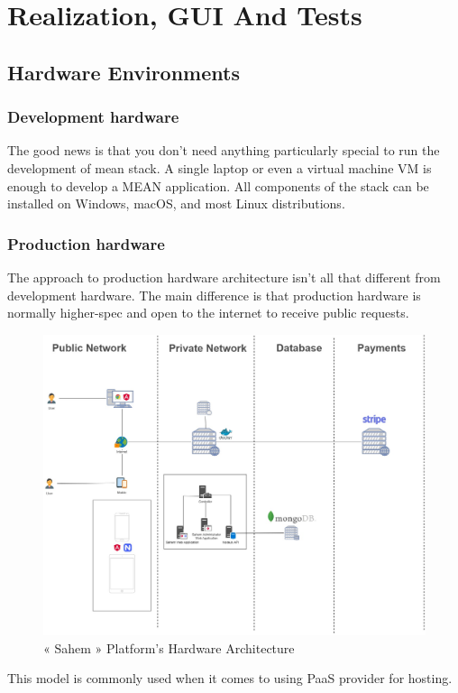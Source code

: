 

\setcounter{mtc}{11}

\chapter{Realization, GUI And Tests}%
\label{chap:chapter_four}
\minitoc

\section{Hardware Environments}

\subsection{Development hardware }
The good news is that you don’t need anything particularly special to run the development of mean stack. A single laptop or even a virtual machine \ac{VM} is enough to develop a MEAN application. All components of the stack can be installed on Windows, macOS, and most Linux distributions.

\subsection{Production hardware }
The approach to production hardware architecture isn’t all that different from development hardware. The main difference is that production hardware is normally higher-spec and open to the internet to receive public requests.

\begin{figure}[!ht]
      \centering
      \includegraphics[scale=0.25]{assets/architecturedrawio.jpg}
      \caption{« Sahem » Platform's Hardware Architecture}
      \label{fig:sahemarchitecturedrawio}
\end{figure}
This model is commonly used when it comes to using \ac{PaaS} provider for hosting.
